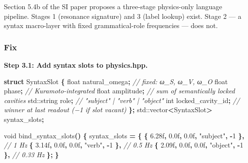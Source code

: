 \documentclass[
  11pt,
  a4paper,
]{article}
\newenvironment{Shaded}{\begin{snugshade}}{\end{snugshade}}
\newcommand{\BuiltInTok}[1]{#1}
\newcommand{\CommentTok}[1]{\textcolor[rgb]{0.56,0.35,0.01}{\textit{#1}}}
\newcommand{\DataTypeTok}[1]{\textcolor[rgb]{0.13,0.29,0.53}{#1}}
\newcommand{\DecValTok}[1]{\textcolor[rgb]{0.00,0.00,0.81}{#1}}
\newcommand{\FloatTok}[1]{\textcolor[rgb]{0.00,0.00,0.81}{#1}}
\newcommand{\KeywordTok}[1]{\textcolor[rgb]{0.13,0.29,0.53}{\textbf{#1}}}
\newcommand{\NormalTok}[1]{#1}
\newcommand{\OperatorTok}[1]{\textcolor[rgb]{0.81,0.36,0.00}{\textbf{#1}}}
\newcommand{\StringTok}[1]{\textcolor[rgb]{0.31,0.60,0.02}{#1}}
\begin{document}
Section 5.4b of the SI paper proposes a three-stage physics-only
language pipeline. Stages 1 (resonance signature) and 3 (label lookup)
exist. Stage 2 --- a syntax macro-layer with fixed grammatical-role
frequencies --- does not.

\subsubsection{Fix}\label{fix-2}

\textbf{Step 3.1: Add syntax slots to physics.hpp.}

\begin{Shaded}
\begin{Highlighting}[]
\KeywordTok{struct}\NormalTok{ SyntaxSlot }\OperatorTok{\{}
    \DataTypeTok{float}\NormalTok{ natural\_omega}\OperatorTok{;}      \CommentTok{// fixed: ω\_S, ω\_V, ω\_O}
    \DataTypeTok{float}\NormalTok{ phase}\OperatorTok{;}              \CommentTok{// Kuramoto{-}integrated}
    \DataTypeTok{float}\NormalTok{ amplitude}\OperatorTok{;}          \CommentTok{// sum of semantically locked cavities}
    \BuiltInTok{std::}\NormalTok{string role}\OperatorTok{;}         \CommentTok{// "subject" | "verb" | "object"}
    \DataTypeTok{int}\NormalTok{   locked\_cavity\_id}\OperatorTok{;}   \CommentTok{// winner at last readout (−1 if slot vacant)}
\OperatorTok{\};}
\BuiltInTok{std::}\NormalTok{vector}\OperatorTok{\textless{}}\NormalTok{SyntaxSlot}\OperatorTok{\textgreater{}}\NormalTok{ syntax\_slots}\OperatorTok{;}

\DataTypeTok{void}\NormalTok{ bind\_syntax\_slots}\OperatorTok{()} \OperatorTok{\{}
\NormalTok{    syntax\_slots }\OperatorTok{=} \OperatorTok{\{}
        \OperatorTok{\{} \FloatTok{6.28}\BuiltInTok{f}\OperatorTok{,} \FloatTok{0.0}\BuiltInTok{f}\OperatorTok{,} \FloatTok{0.0}\BuiltInTok{f}\OperatorTok{,} \StringTok{"subject"}\OperatorTok{,} \OperatorTok{{-}}\DecValTok{1} \OperatorTok{\},}  \CommentTok{// 1 Hz}
        \OperatorTok{\{} \FloatTok{3.14}\BuiltInTok{f}\OperatorTok{,} \FloatTok{0.0}\BuiltInTok{f}\OperatorTok{,} \FloatTok{0.0}\BuiltInTok{f}\OperatorTok{,} \StringTok{"verb"}\OperatorTok{,}    \OperatorTok{{-}}\DecValTok{1} \OperatorTok{\},}  \CommentTok{// 0.5 Hz}
        \OperatorTok{\{} \FloatTok{2.09}\BuiltInTok{f}\OperatorTok{,} \FloatTok{0.0}\BuiltInTok{f}\OperatorTok{,} \FloatTok{0.0}\BuiltInTok{f}\OperatorTok{,} \StringTok{"object"}\OperatorTok{,}  \OperatorTok{{-}}\DecValTok{1} \OperatorTok{\},}  \CommentTok{// 0.33 Hz}
    \OperatorTok{\};}
\OperatorTok{\}}
\end{Highlighting}
\end{Shaded}
\end{document}
